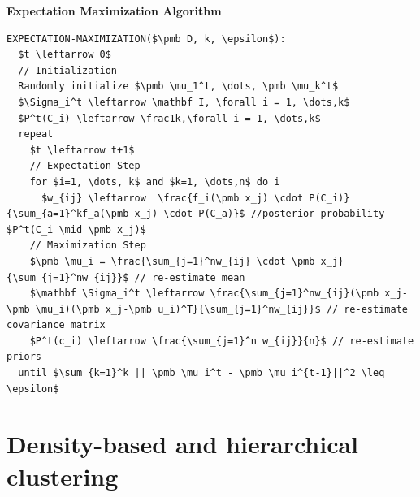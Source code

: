 \documentclass[a4, english]{article}
\begin{document}
\begin{framed}  
\begin{center}  
  \textbf{Expectation Maximization Algorithm} 
\end{center}
\begin{lstlisting}[mathescape=true, keywordstyle=\ttfamily]
EXPECTATION-MAXIMIZATION($\pmb D, k, \epsilon$):
  $t \leftarrow 0$ 
  // Initialization
  Randomly initialize $\pmb \mu_1^t, \dots, \pmb \mu_k^t$ 
  $\Sigma_i^t \leftarrow \mathbf I, \forall i = 1, \dots,k$ 
  $P^t(C_i) \leftarrow \frac1k,\forall i = 1, \dots,k$
  repeat
    $t \leftarrow t+1$
    // Expectation Step
    for $i=1, \dots, k$ and $k=1, \dots,n$ do i
      $w_{ij} \leftarrow  \frac{f_i(\pmb x_j) \cdot P(C_i)}{\sum_{a=1}^kf_a(\pmb x_j) \cdot P(C_a)}$ //posterior probability $P^t(C_i \mid \pmb x_j)$ 
    // Maximization Step
    $\pmb \mu_i = \frac{\sum_{j=1}^nw_{ij} \cdot \pmb x_j}{\sum_{j=1}^nw_{ij}}$ // re-estimate mean
    $\mathbf \Sigma_i^t \leftarrow \frac{\sum_{j=1}^nw_{ij}(\pmb x_j- \pmb \mu_i)(\pmb x_j-\pmb u_i)^T}{\sum_{j=1}^nw_{ij}}$ // re-estimate covariance matrix
    $P^t(c_i) \leftarrow \frac{\sum_{j=1}^n w_{ij}}{n}$ // re-estimate priors 
  until $\sum_{k=1}^k || \pmb \mu_i^t - \pmb \mu_i^{t-1}||^2 \leq \epsilon$ 
\end{lstlisting}
\end{framed}
\newpage 

\section{Density-based and hierarchical clustering}
\end{document}
